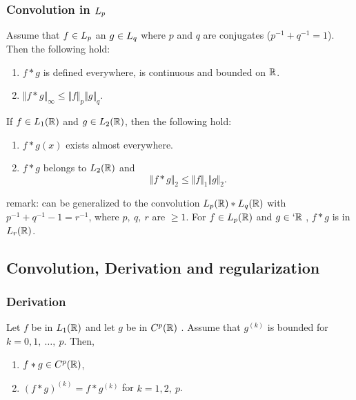 \begin{frame}
\frametitle{Convolution in $L_{p}$}
\begin{theorem}
Assume that $f\in L_{p}$ an $g\in L_{q}$ where $p$ and $q$ are conjugates ($p^{-1} + q^{-1}=1$).
Then the following hold:
\begin{enumerate}[label=(\roman*)]
\item $f*g$  is defined everywhere, is continuous  and  bounded on $\mathbb{R}$.
\item $\Vert f*g\Vert_{\infty}\leq\Vert f\Vert_{p}\Vert g\Vert_{q}$.
\end{enumerate}
\end{theorem}
\end{frame}

\begin{frame}
\begin{theorem}
If $f\in L_1(\mathbb{R})$ and $g\in L_2(\mathbb{R})$, then the following hold:
\begin{enumerate}[label=(\roman*)]
\item $f*g(x)$ exists almost everywhere.
\item $f*g$ belongs to  $L_2(\mathbb{R})$ and
$$
\Vert f*g\Vert_{2}\leq\Vert f\Vert_{1}\Vert g\Vert_{2} .
$$
\end{enumerate}
\end{theorem}
\alert{remark:}  can be generalized to the convolution $L_{p}(\mathbb{R})*L_{q}(\mathbb{R})$ with $p^{-1}+q^{-1}-1=r^{-1}$, where $p,\ q,\ r$ are $\geq 1$. For $f\in L_{p}(\mathbb{R})$ and $ g\in \lq{\rset}$ , $f*g$ is in $L_{r}(\mathbb{R})$.
\end{frame}

\subsection{Convolution, Derivation and regularization}

\begin{frame}
\frametitle{Derivation}
\begin{theorem}
Let $f$ be in $L_1(\mathbb{R})$ and let $g$ be in $C^{p}(\mathbb{R})$ .  Assume that $g^{(k)}$ is bounded for $k=0,1,\ \ldots,\ p$. Then,
\begin{enumerate}[label=(\roman*)]
\item $ f*g\in C^{p}(\mathbb{R})$,
\item  $(f*g)^{(k)}=f*g^{(k)}$  for $k=1,2,\ p$.
\end{enumerate}
\end{theorem}
\end{frame}

